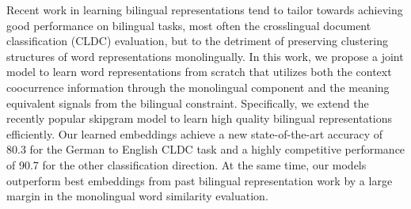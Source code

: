 Recent work in learning bilingual representations tend to tailor towards achieving good performance on bilingual tasks, most often the crosslingual document classification (CLDC) evaluation, but to the detriment of preserving clustering structures of word representations monolingually. In this work, we propose a joint model to learn word representations from scratch that utilizes both the context coocurrence information through the monolingual component and the meaning equivalent signals from the bilingual constraint. Specifically, we extend the recently popular skipgram model to learn high quality bilingual representations efficiently. Our learned embeddings achieve a new state-of-the-art accuracy of 80.3 for the German to English CLDC task and a highly competitive performance of 90.7 for the other classification direction. At the same time, our models outperform best embeddings from past bilingual representation work by a large margin in the monolingual word similarity evaluation.
